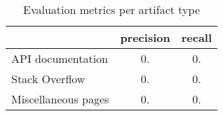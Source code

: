 \begin{table}
\caption{Evaluation metrics per artifact type}
\label{tbl:comparison-per-artifact-type}
\centering    
\begin{threeparttable}
\begin{tabular}{lcc}

  & \textbf{precision} & \textbf{recall}  \\ 
\hline

API documentation & 0. & 0. 
\\

Stack Overflow  & 0. & 0. 
\\

Miscellaneous pages & 0. & 0.
\\

\hline
\end{tabular}
\end{threeparttable}
\end{table}
